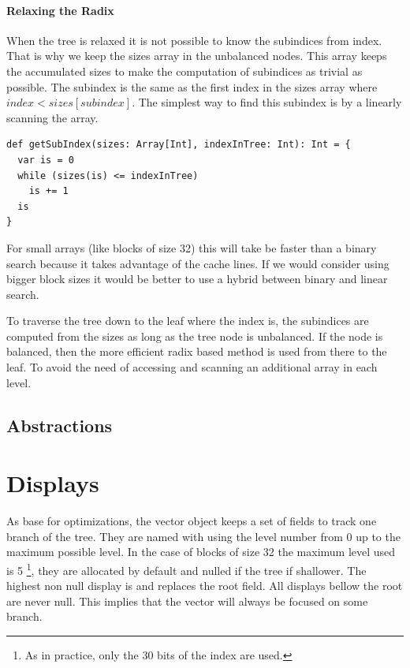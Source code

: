 \paragraph{Relaxing the Radix}
When the tree is relaxed it is not possible to know the subindices from index. That is why we keep the sizes array in the unbalanced nodes. This array keeps the accumulated sizes to make the computation of subindices as trivial as possible. The subindex is the same as the first index in the sizes array where $index < sizes[subindex]$. The simplest way to find this subindex is by a linearly scanning the array. 

\begin{lstlisting}[frame=single]
def getSubIndex(sizes: Array[Int], indexInTree: Int): Int = {
  var is = 0
  while (sizes(is) <= indexInTree)
    is += 1
  is
}
\end{lstlisting}

For small arrays (like blocks of size 32) this will take be faster than a binary search because it takes advantage of the cache lines. If we would consider using bigger block sizes it would be better to use a hybrid between binary and linear search.

To traverse the tree down to the leaf where the index is, the subindices are computed from the sizes as long as the tree node is unbalanced. If the node is balanced, then the more efficient radix based method is used from there to the leaf. To avoid the need of accessing and scanning an additional array in each level.



\subsection{Abstractions}



\section{Displays}
As base for optimizations, the vector object keeps a set of fields to track one branch of the tree. They are named with using the level number from 0 up to the maximum possible level. In the case of blocks of size 32 the maximum level used is 5 \footnote{As in practice, only the 30 bits of the index are used.}, they are allocated by default and nulled if the tree if shallower. The highest non null display is and replaces the root field. All displays bellow the root are never null. This implies that the vector will always be focused on some branch.

